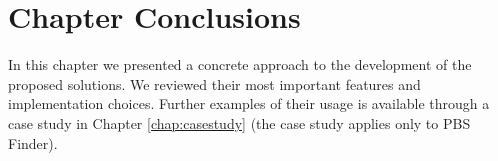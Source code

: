 \section{Chapter Conclusions}


In this chapter we presented a concrete approach to the development of the
proposed solutions. We reviewed their most important features and implementation
choices. Further examples of their usage is available through a case study in
Chapter \ref{chap:casestudy} (the case study applies only to PBS Finder).
